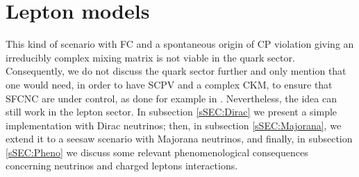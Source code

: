 \documentclass[12pt,a4paper]{article}
\begin{document}
\section{Lepton models\label{SEC:LeptonModel}}
This kind of scenario with FC and a spontaneous origin of CP violation giving an irreducibly complex mixing matrix is not viable in the quark sector. Consequently, we do not discuss the quark sector further and only mention that one would need, in order to have SCPV and a complex CKM, to ensure that SFCNC are under control, as done for example in \cite{Nebot:2018nqn}. Nevertheless, the idea can still work in the lepton sector. In subsection \ref{sSEC:Dirac} we present a simple implementation with Dirac neutrinos; then, in subsection \ref{sSEC:Majorana}, we extend it to a seesaw scenario with Majorana neutrinos, and finally, in subsection \ref{sSEC:Pheno} we discuss some relevant phenomenological consequences concerning neutrinos and charged leptons interactions.

\end{document}

